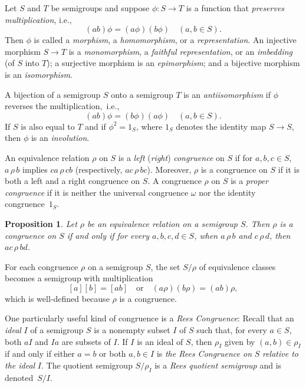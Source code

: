 \documentclass{surv-l}
\numberwithin{equation}{section}
\numberwithin{table}{section}
\numberwithin{figure}{section}
\newtheorem{proposition}[equation]{Proposition}
\theoremstyle{definition}
\begin{document}
Let $S$ and $T$ be semigroups and suppose $\phi : S\rightarrow T$
is a function that \emph{preserves multiplication}, i.e.,
\[
(ab)\phi=(a\phi)(b\phi)\quad (a, b\in S).
\]
Then $\phi$ is called a \emph{morphism}, a
\emph{homomorphism}, or a
\emph{representation}. An injective morphism $S\rightarrow T$ is a
\emph{monomorphism}, a \emph{faithful
representation}, or an
\emph{imbedding} (of $S$ into $T$); a surjective
morphism is an \emph{epimorphism}; and a
bijective morphism is an \emph{isomorphism}.

A bijection of a semigroup $S$ onto a semigroup $T$ is an
\emph{antiisomorphism} if $\phi$ reverses
the multiplication,~i.e.,
\[
(ab)\phi=(b\phi)(a\phi)\quad (a, b\in S).
\]
If $S$ is also equal to $T$ and if $\phi^{2}=1_{S}$, where $1_{S}$
denotes the identity map $S\rightarrow S$, then $\phi$ is an
\emph{involution}.

An equivalence relation $\rho$ on $S$ is a \emph{left}
(\emph{right}) \emph{congruence} on $S$ if for $a, b, c\in S$,
$a\,\rho\,b$ implies $ca\,\rho\,cb$ (respectively, $ac\,\rho\,bc$).
Moreover, $\rho$ is a congruence on $S$ if it is both a left and a
right congruence on $S$. A congruence $\rho$ on $S$ is a
\emph{proper congruence} if it is neither
the universal congruence $\omega$ nor the identity
congruence~$1_{S}$.

\begin{proposition}\label{propA.76.1}
Let $\rho$ be an equivalence relation on a semigroup $S$. Then
$\rho$ is a congruence on $S$ if and only if for every $a, b,
c, d\in S$, when $a\,\rho\,b$ and $c\,\rho\,d$, then $ac\,\rho\,bd$.
\end{proposition}

For each congruence $\rho$ on a semigroup $S$, the set
$S/\rho$ of equivalence classes becomes a semigroup with
multiplication
\[
[a][b]=[ab]\quad \mathrm{or}\quad (a\rho)(b\rho)=(ab)\rho,
\]
which is well-defined because $\rho$ is a congruence.

One particularly useful kind of congruence is a \emph{Rees
Congruence}: Recall that an
\emph{ideal} $I$ of a semigroup $S$ is a nonempty
subset $I$ of $S$ such that, for every $a\in S$, both $aI$ and
$Ia$ are subsets of $I$. If $I$ is an ideal of $S$, then $\rho_{I}$
given by $(a, b)\in\rho_{I}$ if and only if either $a=b$ or both
$a,  b\in I$ is \emph{the Rees Congruence on} $S$ \emph{relative
to the ideal} $I$. The quotient semigroup $S/\rho_{I}$ is a
\emph{Rees quotient semigroup} and is denoted~$S/I$.
\end{document}
